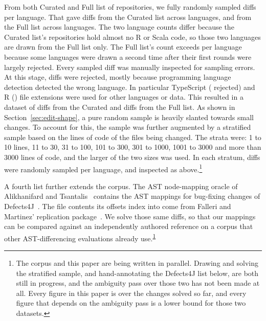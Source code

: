 \documentclass[sigconf]{acmart}
\begin{document}
From both Curated and Full list of repositories, we fully randomly sampled \SampleDiffsPerLanguage{}
diffs per language. That gave \SampleCuratedSampled{} diffs from the Curated list across
\SampleCuratedLanguages{} languages, and \SampleFullSampled{} from the Full list across
\SampleFullLanguages{} languages. The two language counts differ because the Curated list's
repositories hold almost no R or Scala code, so those two languages are drawn from the Full list
only. The Full list's count exceeds \SampleDiffsPerLanguage{} per
language because some languages were drawn a second time after their first rounds were largely
rejected. Every sampled diff was manually inspected for
sampling errors.
At this stage, \SampleRejectedTotal{} diffs were rejected, mostly because programming language detection detected
the wrong language. In particular TypeScript (\SampleRejectedTypeScript{} rejected) and R (\SampleRejectedR{}) file
extensions were used for other languages or data. This resulted in a dataset of \SampleCuratedPromoted{} diffs from the
Curated and \SampleFullPromoted{} diffs from the Full list. As shown in Section~\ref{sec:edit-shape}, a pure random
sample is heavily slanted towards small changes. To account for this, the sample was further
augmented by a stratified sample based on the lines of code of the files being changed.
The strata were: 1 to 10 lines, 11 to 30, 31 to 100, 101 to 300, 301 to 1000, 1001 to 3000 and
more than 3000 lines of code, and the larger of the two sizes was used. In each stratum, \SampleStratifiedPerCell{} diffs were randomly
sampled per language, and inspected as above.\footnote{\label{fn:in-progress}The corpus and this
paper are being written in parallel. Drawing and solving the stratified sample, and hand-annotating
the Defects4J list below, are both still in progress, and the ambiguity pass over those two has not
been made at all. Every figure in this paper is over the \NumFixtures{} changes solved so far, and
every figure that depends on the ambiguity pass is a lower bound for those two datasets.}

A fourth list further extends the corpus. The AST node-mapping oracle of Alikhanifard and
Tsantalis~\cite{astdiffbenchmark} contains the \OracleUnits{} AST mappings for \OracleCases{}
bug-fixing changes of Defects4J~\cite{defects4j}. The file contents its offsets index into come
from Falleri and Martinez' replication package~\cite{gumtreesimple}. We solve those same
\OracleUnits{} diffs, so that our mappings can be compared against an
independently authored reference on a corpus that other AST-differencing evaluations already
use.\textsuperscript{\ref{fn:in-progress}}
\end{document}
